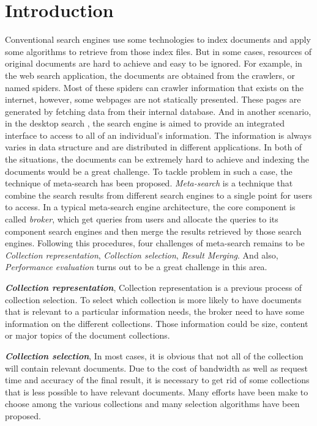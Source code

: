 \setcounter{page}{1}  %
\cite{Sakai2007}
\chapter{Introduction}
 Conventional search engines use some technologies to index documents and apply some algorithms to retrieve from those index files. But in some cases, resources of original documents are hard to achieve and easy to be ignored. For example, in the web search application, the documents are obtained from the crawlers, or named spiders. Most of these spiders can crawler information that exists on the internet, however, some webpages are not statically presented. These pages are generated by fetching data from their internal database. And in another scenario, in the desktop search \cite{Thomas2010}, the search engine is aimed to provide an integrated  interface to access to all of an individual's information. The information is always varies in data structure and are distributed in different applications. In both of the situations, the documents can be extremely hard to achieve and indexing the documents would be a great challenge. To tackle problem in such a case, the technique of meta-search has been proposed. \textit{Meta-search} is a technique that combine the search results from different search engines to a single point for users to access. In a typical meta-search engine architecture, the core component is called \textit{broker}, which get queries from users and allocate the queries to its component search engines and then merge the results retrieved by those search engines. Following this procedures, four challenges of meta-search remains to be \textit{Collection representation}, \textit{Collection selection}, \textit{Result Merging}. And also, \textit{Performance evaluation} turns out to be a great challenge in this area.
 
 \textbf{\emph{Collection representation}},
 Collection representation is a previous process of collection selection. To select which collection is more likely to have documents that is relevant to a particular information needs, the broker need to have some information on the different collections. Those information could be size, content or major topics of the document collections.
 
 \textbf{\emph{Collection selection}},
 In most cases, it is obvious that not all of the collection will contain relevant documents. Due to the cost of bandwidth as well as request time and accuracy of the final result, it is necessary to get rid of some collections that is less possible to have relevant documents. Many efforts have been make to choose among the various collections and many selection algorithms have been proposed.
 
